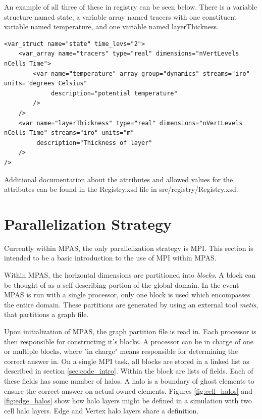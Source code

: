 \documentclass[11pt]{report}
\begin{document}
An example of all three of these in registry can be seen below. There is a
variable structure named state, a variable array named tracers with one
constituent variable named temperature, and one variable named layerThickness.

{\tiny
\begin{lstlisting}
<var_struct name="state" time_levs="2">
	<var_array name="tracers" type="real" dimensions="nVertLevels nCells Time">
		<var name="temperature" array_group="dynamics" streams="iro" units="degrees Celsius"
		     description="potential temperature"
		/>
	/>
	<var name="layerThickness" type="real" dimensions="nVertLevels nCells Time" streams="iro" units="m"
	     description="Thickness of layer"
	/>
/>
\end{lstlisting}
}

Additional documentation about the attributes and allowed values for the
attributes can be found in the Registry.xsd file in src/registry/Registry.xsd.

\section{Parallelization Strategy}
Currently within MPAS, the only parallelization strategy is MPI. This section
is intended to be a basic introduction to the use of MPI within MPAS.

Within MPAS, the horizontal dimensions are partitioned into {\it blocks}. A
block can be thought of as a self describing portion of the global domain. In
the event MPAS is run with a single processor, only one block is used which
encompasses the entire domain. These partitions are generated by using an
external tool {\it metis}, that partitions a graph file.

Upon initialization of MPAS, the graph partition file is read in. Each
processor is then responsible for constructing it's blocks. A processor can be
in charge of one or multiple blocks, where "in charge" means responsible for
determining the correct answer in. On a single MPI task, all blocks are stored
in a linked list as described in section \ref{sec:code_intro}. Within the block
are lists of fields. Each of these fields has some number of halos. A halo is a
boundary of ghost elements to ensure the correct answer on actual owned
elements. Figures \ref{fig:cell_halos} and \ref{fig:edge_halos} show how halo
layers might be defined in a simulation with two cell halo layers. Edge and
Vertex halo layers share a definition.
\end{document}
